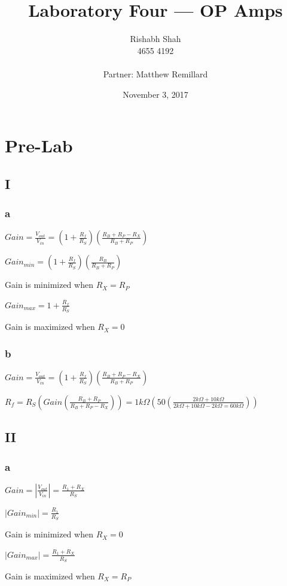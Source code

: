 \documentclass[10pt]{article}
\begin{document}
\title{Laboratory Four --- OP Amps}
\date{November 3, 2017}
\author{Rishabh Shah\\ 4655 4192\\ \\ Partner: Matthew Remillard}
\maketitle
\newpage

\section*{Pre-Lab}
\subsection*{I}
\subsubsection*{a}
{\doublespacing
\noindent $Gain = \frac{V_{out}}{V_{in}} = (1+\frac{R_f}{R_S})(\frac{R_B+R_P-R_X}{R_B+R_P})$

\noindent $Gain_{min} = (1+\frac{R_f}{R_S})(\frac{R_B}{R_B+R_P})$
	
\noindent Gain is minimized when $R_X = R_P$

\noindent $Gain_{max} = 1+\frac{R_f}{R_S}$

\noindent Gain is maximized when $R_X = 0$}

\subsubsection*{b}
{\doublespacing
\noindent $Gain = \frac{V_{out}}{V_{in}} = (1+\frac{R_f}{R_S})(\frac{R_B+R_P-R_X}{R_B+R_P})$

\noindent $R_f = R_S(Gain(\frac{R_B+R_P}{R_B+R_P-R_X})) = 1k\Omega(50(\frac{2k\Omega+10k\Omega}{2k\Omega+10k\Omega-2k\Omega = 60k\Omega}))$}

\subsection*{II}
\subsubsection*{a}
{\doublespacing
\noindent $Gain = |\frac{V_{out}}{V_{in}}| = \frac{R_1+R_X}{R_S}$

\noindent $|Gain_{min}| = \frac{R_1}{R_S}$

\noindent Gain is minimized when $R_X = 0$

\noindent $|Gain_{max}| = \frac{R_1+R_X}{R_S}$

\noindent Gain is maximized when $R_X = R_P$}
\end{document}
